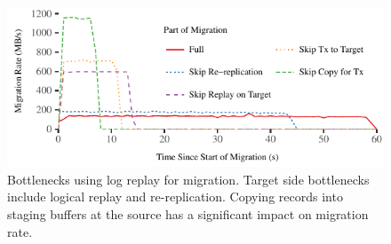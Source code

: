 \begin{figure}[t]
\includegraphics[width=\columnwidth]{graphs/migration-bottlenecks.pdf}
\caption{Bottlenecks using log replay for migration. Target side
    bottlenecks include logical replay and re-replication.
    Copying records into staging buffers at the source has a
    significant impact on migration rate.}
\label{fig:bottlenecks}
\end{figure}
